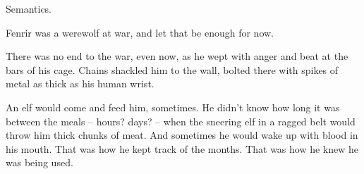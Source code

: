 Semantics.

Fenrir was a werewolf at war, and let that be enough for now.

There was no end to the war, even now, as he wept with anger and beat at
the bars of his cage. Chains shackled him to the wall, bolted there with
spikes of metal as thick as his human wrist.

An elf would come and feed him, sometimes. He didn't know how long it
was between the meals -- hours? days? -- when the sneering elf in a
ragged belt would throw him thick chunks of meat. And sometimes he would
wake up with blood in his mouth. That was how he kept track of the
months. That was how he knew he was being used.
